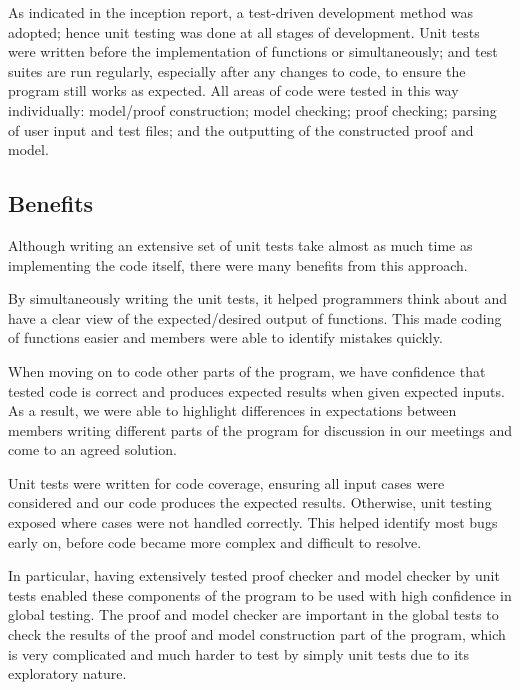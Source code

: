 As indicated in the inception report, a test-driven development method was adopted; hence unit testing was done at all stages of development. Unit tests were written before the implementation of functions or simultaneously; and test suites are run regularly, especially after any changes to code, to ensure the program still works as expected. All areas of code were tested in this way individually: model/proof construction; model checking; proof checking; parsing of user input and test files; and the outputting of the constructed proof and model.

\subsection*{Benefits}
Although writing an extensive set of unit tests take almost as much time as implementing the code itself, there were many benefits from this approach.

By simultaneously writing the unit tests, it helped programmers think about and have a clear view of the expected/desired output of functions. This made coding of functions easier and members were able to identify mistakes quickly.

When moving on to code other parts of the program, we have confidence that tested code is correct and produces expected results when given expected inputs. As a result, we were able to highlight differences in expectations between members writing different parts of the program for discussion in our meetings and come to an agreed solution.

Unit tests were written for code coverage, ensuring all input cases were considered and our code produces the expected results. Otherwise, unit testing exposed where cases were not handled correctly. This helped identify most bugs early on, before code became more complex and difficult to resolve.

In particular, having extensively tested proof checker and model checker by unit tests enabled these components of the program to be used with high confidence in global testing. The proof and model checker are important in the global tests to check the results of the proof and model construction part of the program, which is very complicated and much harder to test by simply unit tests due to its exploratory nature.

